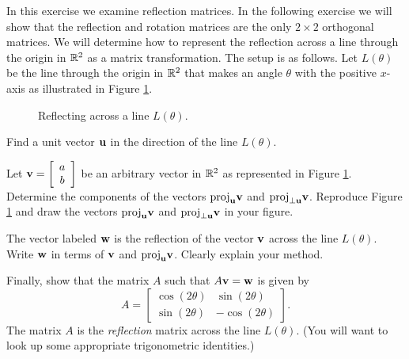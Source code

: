 \item \label{ex:Reflection_matrices} In this exercise we examine reflection matrices. In the following exercise we will show that the reflection and rotation matrices are the only $2 \times 2$ orthogonal matrices. We will determine how to represent the reflection across a line through the origin in $\mathbb{R}^2$ as a matrix transformation. The setup is as follows. Let $L(\theta)$ be the line through the origin in $\mathbb{R}^2$ that makes an angle $\theta$ with the positive $x$-axis as illustrated in Figure \ref{F:Reflection}.
\begin{figure}[h]
\begin{center}
\caption{Reflecting across a line $L(\theta)$.}
\label{F:Reflection}
\end{center}
\end{figure}

\ba
\item Find a unit vector $\mathbf{u}$ in the direction of the line $L(\theta)$. 

\item Let $\mathbf{v} = \left[ \begin{array}{c} a\\b \end{array} \right]$ be an arbitrary vector in $\mathbb{R}^2$ as represented in Figure \ref{F:Reflection}. Determine the components of the vectors $\text{proj}_{\mathbf{u}} \mathbf{v}$ and $\text{proj}_{\perp \mathbf{u}} \mathbf{v}$. Reproduce Figure \ref{F:Reflection} and draw the vectors $\text{proj}_{\mathbf{u}} \mathbf{v}$ and $\text{proj}_{\perp \mathbf{u}} \mathbf{v}$ in your figure.

\item The vector labeled $\mathbf{w}$ is the reflection of the vector $\mathbf{v}$ across the line $L(\theta)$. Write $\mathbf{w}$ in terms of $\mathbf{v}$ and $\text{proj}_{\mathbf{u}} \mathbf{v}$. Clearly explain your method.

\item Finally, show that the matrix $A$ such that $A \mathbf{v} = \mathbf{w}$ is given by 
\[A = \left[ \begin{array}{cr} \cos(2\theta)&\sin(2\theta) \\ \sin(2\theta)& -\cos(2\theta) \end{array} \right].\]
The matrix $A$ is the \emph{reflection} matrix across the line $L(\theta)$. (You will want to look up some appropriate trigonometric identities.)

\ea


